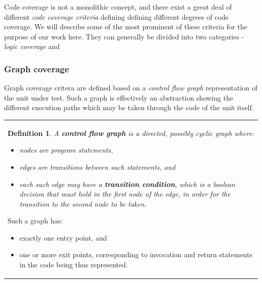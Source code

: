 \documentclass{article}
\newcommand{\tmem}[1]{{\em #1\/}}
\newcommand{\tmtextbf}[1]{{\bfseries{#1}}}
\newcommand{\tmtextit}[1]{{\itshape{#1}}}
\newenvironment{itemizedot}{\begin{itemize} \renewcommand{\labelitemi}{$\bullet$}\renewcommand{\labelitemii}{$\bullet$}\renewcommand{\labelitemiii}{$\bullet$}\renewcommand{\labelitemiv}{$\bullet$}}{\end{itemize}}
\newenvironment{tmparmod}[3]{\begin{list}{}{\setlength{\topsep}{0pt}\setlength{\leftmargin}{#1}\setlength{\rightmargin}{#2}\setlength{\parindent}{#3}\setlength{\listparindent}{\parindent}\setlength{\itemindent}{\parindent}\setlength{\parsep}{\parskip}} \item[]}{\end{list}}
\newtheorem{definition}{Definition}
{\theorembodyfont{\rmfamily}\newtheorem{example}{Example}}
\begin{document}
Code coverage is not a monolithic concept, and there exist a great deal of
different {\tmem{code coverage criteria}} defining defining different degrees
of code coverage. We will describe some of the most prominent of these
criteria for the purpose of our work here. They can generally be divided into
two categories - {\tmem{logic coverage}} and



\subsubsection{Graph coverage}

Graph coverage critera are defined based on a \tmtextit{control flow graph}
representation of the unit under test. Such a graph is effectively an
abstraction showing the different execution paths which may be taken through
the code of the unit itself.



\begin{tmparmod}{1cm}{0pt}{0pt}
  \begin{tmparmod}{0pt}{1cm}{0pt}
    {\noindent}{\noindent}\begin{tabular}{l}
      \begin{definition}
        
        
        
        
        A \tmtextbf{control flow graph} is a directed, possibly cyclic graph
        where:
        \begin{itemizedot}
          \item nodes are program statements,
          
          \item edges are transitions between such statements, and
          
          \item each such edge may have a \tmtextbf{transition condition},
          which is a boolean decision that must hold in the first node of the
          edge, in order for the transition to the second node to be taken.
        \end{itemizedot}
      \end{definition}
      
      Such a graph has:
      \begin{itemizedot}
        \item exactly one entry point, and
        
        \item one or more exit points, corresponding to invocation and return
        statements in the code being thus represented.
      \end{itemizedot}
      
    \end{tabular}{\hspace*{\fill}}{\smallskip}
  \end{tmparmod}
\end{tmparmod}
\end{document}
